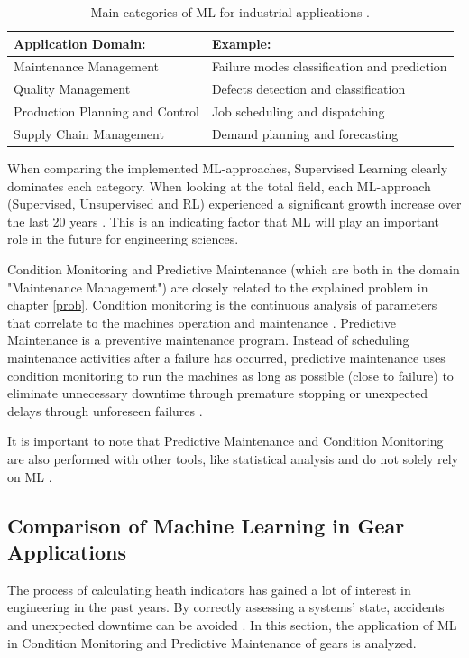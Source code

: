 \begin{table}
	\begin{center}
		\begin{tabular}{|| l | l ||}
			\hline
			\rule{0pt}{2ex}Application Domain: & Example:\\
			\hline
			\hline
			\rule{0pt}{2ex}Maintenance Management & Failure modes classification and prediction\\\hline
			Quality Management & Defects detection and classification\\	\hline
			Production Planning and Control & Job scheduling and dispatching\\\hline
			Supply Chain Management & Demand planning and forecasting\\
			\hline
		\end{tabular}
		\caption{Main categories of ML for industrial applications \cite{Bertolini}.}
		\label{MLIND}
	\end{center}
	\vspace{-4mm}
\end{table}
When comparing the implemented ML-approaches, Supervised Learning clearly dominates each category. When looking at the total field, each ML-approach (Supervised, Unsupervised and RL) experienced a significant growth increase over the last 20 years \cite{Bertolini}. This is an indicating factor that ML will play an important role in the future for engineering sciences.

Condition Monitoring and Predictive Maintenance (which are both in the domain "Maintenance Management") are closely related to the explained problem in chapter \ref{prob}.
Condition monitoring is the continuous analysis of parameters that correlate to the machines operation and maintenance \cite{Rao}. Predictive Maintenance is a preventive maintenance program. Instead of scheduling maintenance activities after a failure has occurred, predictive maintenance uses condition monitoring to run the machines as long as possible (close to failure) to eliminate unnecessary downtime through premature stopping or unexpected delays through unforeseen failures \cite{Mobley}.

It is important to note that Predictive Maintenance and Condition Monitoring are also performed with other tools, like statistical analysis and do not solely rely on ML \cite{Carvalho, Divya}. 


 
\subsection{Comparison of Machine Learning in Gear Applications}
The process of calculating heath indicators has gained a lot of interest in engineering in the past years. By correctly assessing a systems' state, accidents and unexpected downtime can be avoided \cite{Wang}. In this section, the application of ML in Condition Monitoring and Predictive Maintenance of gears is analyzed.

